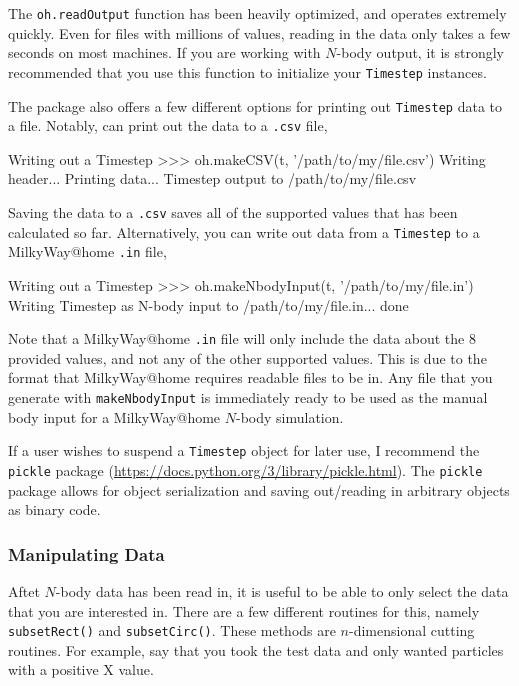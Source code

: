\documentclass{article}
\begin{document}
The \verb!oh.readOutput! function has been heavily optimized, and operates extremely quickly. Even for files with millions of values, reading in the data only takes a few seconds on most machines. If you are working with $N$-body output, it is strongly recommended that you use this function to initialize your \verb!Timestep! instances.

The \mwahpy package also offers a few different options for printing out \verb!Timestep! data to a file. Notably, \mwahpy can print out the data to a \verb!.csv! file, \\

\begin{codelisting}{Writing out a Timestep}
>>> oh.makeCSV(t, '/path/to/my/file.csv')
Writing header...
Printing data...
Timestep output to /path/to/my/file.csv
\end{codelisting}

Saving the data to a \verb!.csv! saves all of the supported values that has been calculated so far. Alternatively, you can write out data from a \verb!Timestep! to a MilkyWay@home \verb!.in! file, \\

\begin{codelisting}{Writing out a Timestep}
>>> oh.makeNbodyInput(t, '/path/to/my/file.in')
Writing Timestep as N-body input to /path/to/my/file.in...
done
\end{codelisting}

Note that a MilkyWay@home \verb!.in! file will only include the data about the 8 provided values, and not any of the other supported values. This is due to the format that MilkyWay@home requires readable files to be in. Any file that you generate with \verb!makeNbodyInput! is immediately ready to be used as the manual body input for a MilkyWay@home $N$-body simulation. 

If a user wishes to suspend a \verb!Timestep! object for later use, I recommend the \verb!pickle! package (\url{https://docs.python.org/3/library/pickle.html}). The \verb!pickle! package allows for object serialization and saving out/reading in arbitrary objects as binary code.

\subsubsection{Manipulating Data}

Aftet $N$-body data has been read in, it is useful to be able to only select the data that you are interested in. There are a few different routines for this, namely \verb!subsetRect()! and \verb!subsetCirc()!. These methods are $n$-dimensional cutting routines. For example, say that you took the test data and only wanted particles with a positive X value. \\
\end{document}
